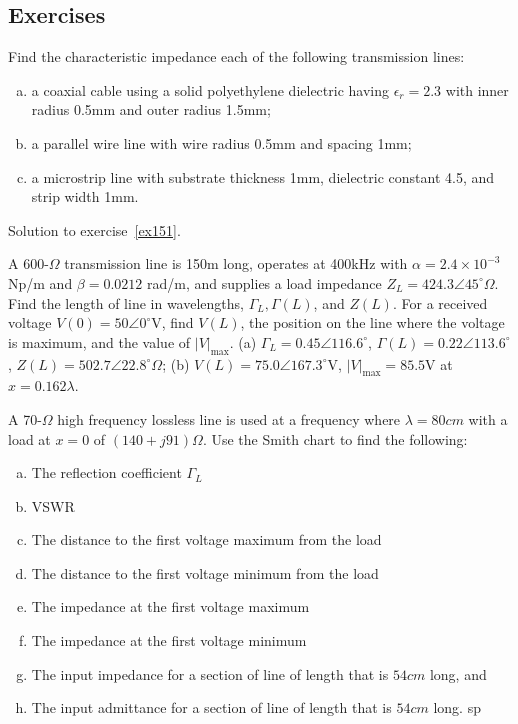 \begin{mdframed}[ backgroundcolor=lightblue, linewidth=1pt, hidealllines=true]
\section{Exercises}
\begin{ExerciseList}

\Exercise[label={ex151}]
Find the characteristic impedance each of the following transmission lines:
\begin{enumerate}[(a)]
\item a coaxial cable using a solid polyethylene dielectric having $\epsilon_r = 2.3$ with inner radius 0.5mm and outer radius 1.5mm; 
\item a parallel wire line with wire radius 0.5mm and spacing 1mm; 
\item a microstrip line with substrate thickness 1mm, dielectric constant 4.5, and strip width 1mm.
\end{enumerate}
\Answer[ref={ex151}]
Solution to exercise~\ref{ex151}.

\Exercise[label={ex152}]
A 600-$\varOmega$ transmission line is 150m long, operates at 400kHz with $\alpha = 2.4\times 10^{-3}$ Np/m and $\beta = 0.0212$ rad/m, and supplies a load impedance $Z_L = 424.3\angle45^{\circ}\varOmega$. Find the length of line in wavelengths, $\Gamma_L, \Gamma(L)$, and $Z(L)$. For a received voltage $V(0) = 50\angle0^{\circ}$V, find $V(L)$, the position on the line where the voltage is maximum, and the value of $|V|_\max$.
\Answer[ref={ex152}]
(a) $\Gamma_L = 0.45\angle116.6^{\circ}$, $\Gamma(L) = 0.22\angle113.6^{\circ}$, $Z(L) = 502.7\angle22.8^{\circ}\varOmega$; (b) $V(L) = 75.0\angle167.3^{\circ}$V, $|V|_\max = 85.5$V at $x = 0.162\lambda$.

\Exercise[label={ex153}]
A 70-$\varOmega$ high frequency lossless line is used at a frequency where $\lambda = 80cm$ with a load at $x = 0$ of $(140 + j91)\varOmega$. Use the Smith chart to find the following:
\begin{enumerate}[(a)]
\item The reflection coefficient $\Gamma_L$ 
\item VSWR
\item The distance to the first voltage maximum from the load
\item The distance to the first voltage minimum from the load
\item The impedance at the first voltage maximum
\item The impedance at the first voltage minimum
\item The input impedance for a section of line of length that is $54cm$ long, and
\item The input admittance for a section of line of length that is $54cm$ long.
sp
\end{enumerate}
\end{ExerciseList}
\end{mdframed}